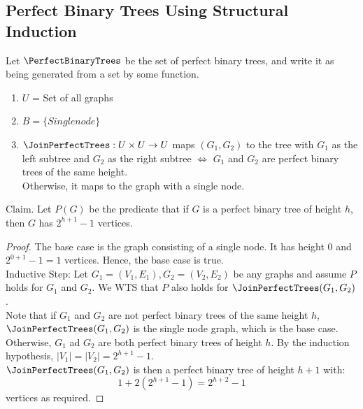 \documentclass{article}
\begin{document}
\subsection{Perfect Binary Trees Using Structural Induction}
Let $\PerfectBinaryTrees$ be the set of perfect binary trees, and write it as being generated from a set by some function.
\begin{enumerate}
    \item $U$ = Set of all graphs
    \item $B = \{Single node\}$
    \item $\JoinPerfectTrees: U \times U \to U$ maps $(G_1, G_2)$ to the tree with $G_1$ as the left subtree and $G_2$ as the right subtree $\iff$ $G_1$ and $G_2$ are perfect binary trees of the same height.\\
    Otherwise, it maps to the graph with a single node.
\end{enumerate}
Claim. Let $P(G)$ be the predicate that if $G$ is a perfect binary tree of height $h$, then $G$ has $2^{h + 1} - 1$ vertices.
\begin{proof}
The base case is the graph consisting of a single node. It has height $0$ and $2^{0 + 1} - 1 = 1$ vertices. Hence, the base case is true.\\
Inductive Step: Let $G_1 = (V_1, E_1), G_2 = (V_2, E_2)$ be any graphs and assume $P$ holds for $G_1$ and $G_2$. We WTS that $P$ also holds for $\JoinPerfectTrees(G_1, G_2)$.\\
Note that if $G_1$ and $G_2$ are not perfect binary trees of the same height $h$, $\JoinPerfectTrees(G_1, G_2)$ is the single node graph, which is the base case.\\
Otherwise, $G_1$ ad $G_2$ are both perfect binary trees of height $h$. By the induction hypothesis, $|V_1| = |V_2| = 2^{h + 1} - 1$.\\
$\JoinPerfectTrees(G_1, G_2)$ is then a perfect binary tree of height $h + 1$ with:
$$1 + 2(2^{h + 1} - 1) = 2^{h + 2} - 1$$
vertices as required.
\end{proof}
\end{document}
